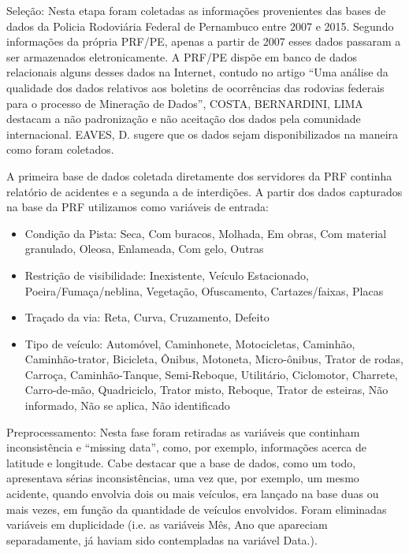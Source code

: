 Seleção: Nesta etapa foram coletadas as informações provenientes das bases de dados da Policia Rodoviária Federal de Pernambuco entre 2007 e 2015. Segundo informações da própria PRF/PE, apenas a partir de 2007 esses dados passaram a ser armazenados eletronicamente. A PRF/PE dispõe em banco de dados relacionais alguns desses dados na Internet,
contudo no artigo “Uma análise da qualidade dos dados relativos aos boletins de ocorrências das rodovias federais para
o processo de Mineração de Dados”, COSTA, BERNARDINI, LIMA \cite{Costa2015} destacam a não padronização e não aceitação dos
dados pela comunidade internacional. EAVES, D. \cite{Eaves} sugere que os dados sejam disponibilizados na maneira como foram
coletados. 

\vspace{5mm}

A primeira base de dados coletada diretamente dos servidores da PRF continha relatório de acidentes e a segunda a de interdições. A partir dos dados capturados na base da PRF utilizamos como variáveis de entrada:

\begin{itemize}
 \item Condição da Pista: {Seca, Com buracos, Molhada, Em obras, Com material granulado, Oleosa, Enlameada, Com gelo, Outras}
 \item Restrição de visibilidade: {Inexistente, Veículo Estacionado, Poeira/Fumaça/neblina, Vegetação, Ofuscamento, Cartazes/faixas, Placas}
 \item Traçado da via: {Reta, Curva, Cruzamento, Defeito}
 \item Tipo de veículo: {Automóvel, Caminhonete, Motocicletas, Caminhão, Caminhão-trator, Bicicleta, Ônibus, Motoneta, Micro-ônibus, Trator de rodas, Carroça, Caminhão-Tanque, Semi-Reboque, Utilitário, Ciclomotor, Charrete, Carro-de-mão, Quadriciclo, Trator misto, Reboque, Trator de esteiras, Não informado, Não se aplica, Não identificado}
\end{itemize}

\vspace{5mm}

Preprocessamento: Nesta fase foram retiradas as variáveis que continham inconsistência e “missing data”, como, por exemplo, informações acerca de latitude e longitude. Cabe destacar que a base de dados, como um todo, apresentava sérias inconsistências, uma vez que, por exemplo,
um mesmo acidente, quando envolvia dois ou mais veículos,
era lançado na base duas ou mais vezes, em função da
quantidade de veículos envolvidos. Foram eliminadas variáveis
em duplicidade (i.e. as variáveis Mês, Ano que apareciam
separadamente, já haviam sido contempladas na variável Data.).

